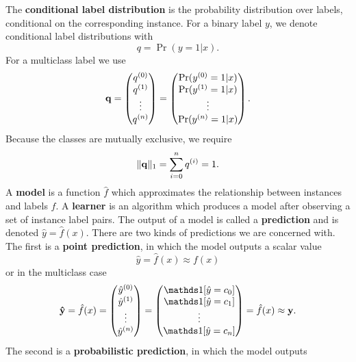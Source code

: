 The {\bf conditional label distribution} is the probability distribution over labels, conditional on the corresponding instance. For a binary label $y$, we denote conditional label distributions with
\begin{equation}
    q = \Pr(y=1|x).
\end{equation}
For a multiclass label we use
\begin{equation}
    \bf{q} = \begin{pmatrix}q^{(0)}\\q^{(1)}\\\vdots \\q^{(n)}\end{pmatrix} =\begin{pmatrix}\Pr(y^{(0)}=1|x)\\\Pr(y^{(1)}=1|x)\\ \vdots\\\Pr(y^{(n)}=1|x) \end{pmatrix}.
\end{equation}
Because the classes are mutually exclusive, we require
\begin{equation}
    \|{\bf q}\|_1=\sum_{i=0}^n q^{(i)} =1.
\end{equation}
A {\bf model} is a function $\hat{f}$ which approximates the relationship between instances and labels $f$. A {\bf learner} is an algorithm which produces a model after observing a set of instance label pairs. The output of a model is called a {\bf prediction} and is denoted $\hat{y} = \hat{f}(x)$. There are two kinds of predictions we are concerned with. The first is a {\bf point prediction}, in which the model outputs a scalar value 
\begin{equation}
    \hat{y} = \hat{f}(x) \approx f(x)
\end{equation}
or in the multiclass case
\begin{equation}
    {\bf \hat{y}} = \hat{f}(x) =  \begin{pmatrix}\yhat{0}\\\yhat{1}\\ \vdots\\\yhat{n} \end{pmatrix} = \begin{pmatrix}\id{\hat{y}=c_0}\\\id{\hat{y}=c_1}\\ \vdots\\\id{\hat{y}=c_n} \end{pmatrix} = \hat{f}(x) \approx {\bf y}.
\end{equation}
The second is a {\bf probabilistic prediction}, in which the model outputs
